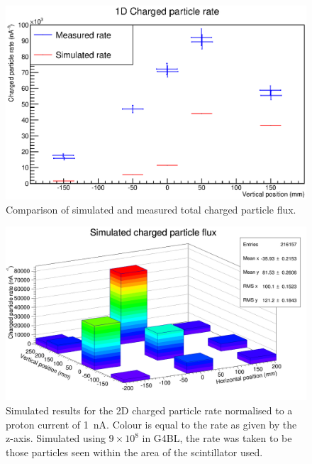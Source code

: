 \begin{figure}[hptb]
  \centering
    \includegraphics[width=.9\textwidth]{images/plot_generating_scripts/1D_charged_particle_flux.eps}
  \caption{Comparison of simulated and measured total charged particle flux.}
  \label{fig:images_plot_generating_scripts_1D_charged_particle_flux}
\end{figure}
  
\begin{figure}[hptb]
  \centering  
    \includegraphics[width=.9\textwidth]{images/plot_generating_scripts/sim_2d_charged_flux.png}
  \caption{Simulated results for the 2D charged particle rate normalised to a proton current of 1~nA. Colour is equal to the rate as given by the z-axis. Simulated using \( 9\times10^8 \) in G4BL, the rate was taken to be those particles seen within the area of the scintillator used.}
  \label{fig:sim_2d_charged_flux}
\end{figure}

